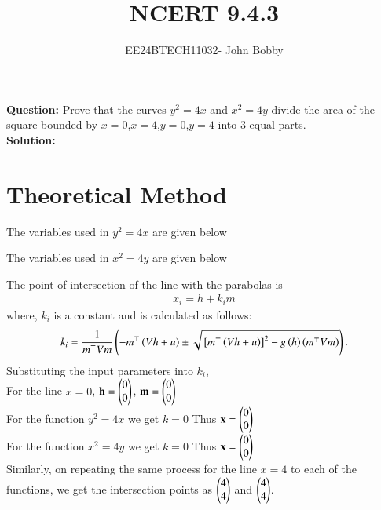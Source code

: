 \documentclass[journal,12pt,onecolumn]{IEEEtran}
\theoremstyle{remark}
\begin{document}

\vspace{3cm}

\title{\textbf{NCERT 9.4.3}}
\author{EE24BTECH11032- John Bobby}
\maketitle
\bigskip
\textbf{Question:} Prove that the curves $y^2=4x$ and $x^2=4y$ divide the area of the square bounded by $x=0$,$x=4$,$y=0$,$y=4$ into $3$ equal parts.\\
\textbf{Solution:}\\
\section{Theoretical Method}
The variables used in $y^2=4x$ are given below
\begin{table}[H]
    \centering
    
\end{table} 
The variables used in $x^2=4y$ are given below
\begin{table}[H]
    \centering
    
\end{table} 
The point of intersection of the line with the parabolas is 
\begin{align}
    x_i = h + k_i m
\end{align}
where, $k_i$ is a constant and is calculated as follows:\\
\begin{align}
k_i = \frac{1}{m^\top Vm} \left(-m^\top \left(Vh + u\right) \pm \sqrt{{}\left[m^\top \left(Vh + u\right)\right]^2 - g\left(h\right)\left(m^\top Vm\right)}\right).
\end{align}
Substituting the input parameters into $k_i$,\\
For the line $x=0$, $\mathbf{h}=\begin{pmatrix}0 \\ 0\end{pmatrix}$, $\mathbf{m}=\begin{pmatrix}0 \\ 0\end{pmatrix}$\\
For the function $y^2=4x$ we get $k=0$ Thus
$\mathbf{x}=\begin{pmatrix}0 \\0\end{pmatrix}$\\
For the function $x^2=4y$ we get $k=0$ Thus
$\mathbf{x}=\begin{pmatrix}0 \\0\end{pmatrix}$\\
Similarly, on repeating the same process for the line $x=4$ to each of the functions, we get the intersection points as $\begin{pmatrix}4\\4\end{pmatrix}$ and $\begin{pmatrix}4 \\4\end{pmatrix}$.\\
\end{document}
